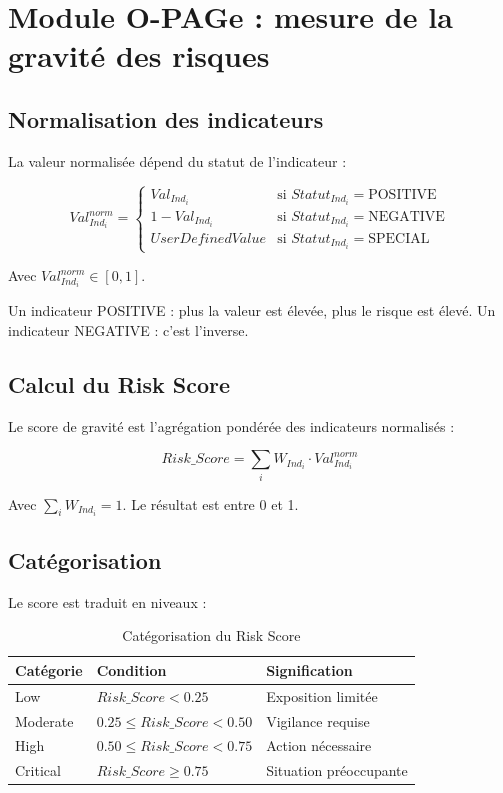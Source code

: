 \section{Module O-PAGe : mesure de la gravité des risques}

\subsection{Normalisation des indicateurs}
La valeur normalisée dépend du statut de l'indicateur :

$$
Val^{norm}_{Ind_i} = \begin{cases}
Val_{Ind_i} & \text{si } Statut_{Ind_i} = \text{POSITIVE} \\
1 - Val_{Ind_i} & \text{si } Statut_{Ind_i} = \text{NEGATIVE} \\
UserDefinedValue & \text{si } Statut_{Ind_i} = \text{SPECIAL}
\end{cases}
$$

Avec $Val^{norm}_{Ind_i} \in [0, 1]$.

Un indicateur POSITIVE : plus la valeur est élevée, plus le risque est élevé. Un indicateur NEGATIVE : c'est l'inverse.

\subsection{Calcul du Risk Score}
Le score de gravité est l'agrégation pondérée des indicateurs normalisés :

$$
Risk\_Score = \sum_{i} W_{Ind_i} \cdot Val^{norm}_{Ind_i}
$$

Avec $\sum_{i} W_{Ind_i} = 1$. Le résultat est entre 0 et 1.

\subsection{Catégorisation}
Le score est traduit en niveaux :

\begin{table}[h!]
\centering
\renewcommand{\arraystretch}{1.3}
\begin{tabular}{@{}p{}p{}p{}@{}}
\hline
\textbf{Catégorie} & \textbf{Condition} & \textbf{Signification} \\
\hline
Low & $Risk\_Score < 0.25$ & Exposition limitée \\
\hline
Moderate & $0.25 \leq Risk\_Score < 0.50$ & Vigilance requise \\
\hline
High & $0.50 \leq Risk\_Score < 0.75$ & Action nécessaire \\
\hline
Critical & $Risk\_Score \geq 0.75$ & Situation préoccupante \\
\hline
\end{tabular}
\caption{Catégorisation du Risk Score}
\end{table}

